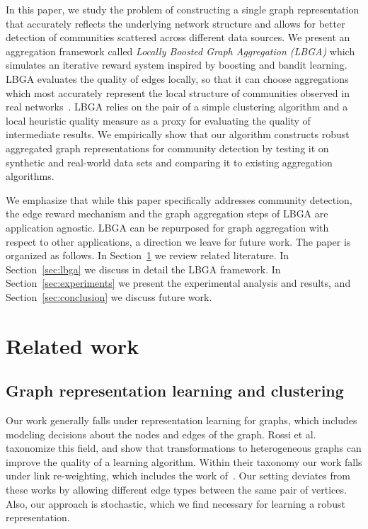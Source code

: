 \documentclass{article}
\begin{document}
In this paper, we study the problem of constructing a single graph
representation that accurately reflects the underlying network structure and
allows for better detection of communities scattered across different data
sources. We present an aggregation framework called \emph{Locally Boosted Graph
Aggregation (LBGA)} which simulates an iterative reward system inspired by
boosting and bandit learning. LBGA evaluates the quality of edges locally, so
that it can choose aggregations which most accurately represent the local
structure of communities observed in real
networks~\cite{Aggarwal2011,Leskovec2008}. LBGA relies on the pair of a simple
clustering algorithm and a local heuristic quality measure as a proxy for
evaluating the quality of intermediate results. We empirically show that our
algorithm constructs robust aggregated graph representations for community
detection by testing it on synthetic and real-world data sets and comparing it
to existing aggregation algorithms. 

We emphasize that while this paper specifically addresses community detection,
the edge reward mechanism and the graph aggregation steps
of LBGA are application agnostic. LBGA can be repurposed for graph aggregation
with respect to other applications, a direction we leave for future work. The
paper is organized as follows.  In Section~\ref{sec:related} we review related
literature. In Section~\ref{sec:lbga} we discuss in detail the LBGA framework.
In Section~\ref{sec:experiments} we present the experimental analysis and
results, and Section~\ref{sec:conclusion} we discuss future work.

\section{Related work} 
\label{sec:related}
\subsection{Graph representation learning and clustering}
Our work generally falls under representation learning for graphs, which
includes modeling decisions about the nodes and edges of the graph. Rossi et
al.~\cite{Rossi2012} taxonomize this field, and show that transformations to
heterogeneous graphs can improve the quality of a learning algorithm. Within
their taxonomy our work falls under link re-weighting, which includes the work
of~\cite{Xiang2010,Gilbert2009}. Our setting deviates from these works by 
allowing different edge types between the same pair of vertices. Also, our
approach is stochastic, which we find necessary for learning a robust
representation. 
\end{document}

